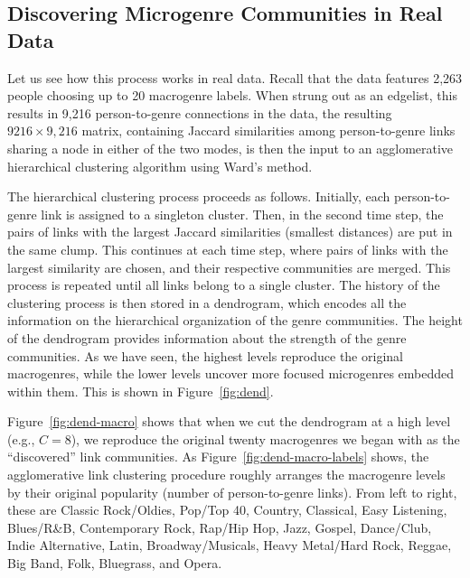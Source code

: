 \documentclass[a4paper,12pt]{extarticle}
\begin{document}
\subsection{Discovering Microgenre Communities in Real Data}
Let us see how this process works in real data. Recall that the data features 2,263 people choosing up to 20 macrogenre labels. When strung out as an edgelist, this results in 9,216 person-to-genre connections in the data, the resulting $9216 \times 9,216$ matrix, containing Jaccard similarities among person-to-genre links sharing a node in either of the two modes, is then the input to an agglomerative hierarchical clustering algorithm using Ward's \citeyearpar{ward63} method. 

The hierarchical clustering process proceeds as follows. Initially, each person-to-genre link is assigned to a singleton cluster. Then, in the second time step, the pairs of links with the largest Jaccard similarities (smallest distances) are put in the same clump. This continues at each time step, where pairs of links with the largest similarity are chosen, and their respective communities are merged. This process is repeated until all links belong to a single cluster. The history of the clustering process is then stored in a dendrogram, which encodes all the information on the hierarchical organization of the genre communities. The height of the dendrogram provides information about the strength of the genre communities. As we have seen, the highest levels reproduce the original macrogenres, while the lower levels uncover more focused microgenres embedded within them. This is shown in Figure~\ref{fig:dend}. 

Figure~\ref{fig:dend-macro} shows that when we cut the dendrogram at a high level (e.g., $C = 8$), we reproduce the original twenty macrogenres we began with as the ``discovered'' link communities. As Figure~\ref{fig:dend-macro-labels} shows, the agglomerative link clustering procedure roughly arranges the macrogenre levels by their original popularity (number of person-to-genre links). From left to right, these are Classic Rock/Oldies, Pop/Top 40, Country, Classical, Easy Listening, Blues/R\&B, Contemporary Rock, Rap/Hip Hop, Jazz, Gospel, Dance/Club, Indie Alternative, Latin, Broadway/Musicals, Heavy Metal/Hard Rock, Reggae, Big Band, Folk, Bluegrass, and Opera. 
\end{document}
